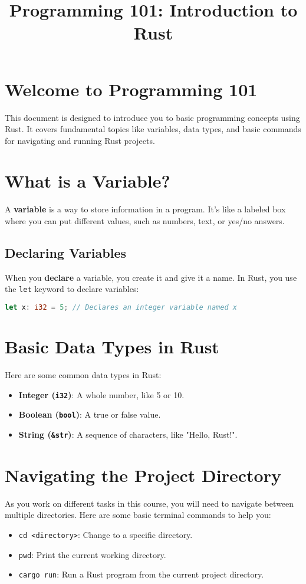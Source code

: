 \documentclass[12pt]{article}
\title{Programming 101: Introduction to Rust}
\author{}
\date{}
\begin{document}
	
	\maketitle
	
	\section*{Welcome to Programming 101}
	This document is designed to introduce you to basic programming concepts using Rust. It covers fundamental topics like variables, data types, and basic commands for navigating and running Rust projects.
	
	\section*{What is a Variable?}
	A \textbf{variable} is a way to store information in a program. It’s like a labeled box where you can put different values, such as numbers, text, or yes/no answers.
	
	\subsection*{Declaring Variables}
	When you \textbf{declare} a variable, you create it and give it a name. In Rust, you use the \texttt{let} keyword to declare variables:
	\begin{lstlisting}[language=Rust]
		let x: i32 = 5; // Declares an integer variable named x
	\end{lstlisting}
	
	\section*{Basic Data Types in Rust}
	Here are some common data types in Rust:
	\begin{itemize}
		\item \textbf{Integer (\texttt{i32})}: A whole number, like 5 or 10.
		\item \textbf{Boolean (\texttt{bool})}: A true or false value.
		\item \textbf{String (\texttt{\&str})}: A sequence of characters, like "Hello, Rust!".
	\end{itemize}
	
	\section*{Navigating the Project Directory}
	As you work on different tasks in this course, you will need to navigate between multiple directories. Here are some basic terminal commands to help you:
	\begin{itemize}
		\item \texttt{cd <directory>}: Change to a specific directory.
		\item \texttt{pwd}: Print the current working directory.
		\item \texttt{cargo run}: Run a Rust program from the current project directory.
	\end{itemize}
	
\end{document}
